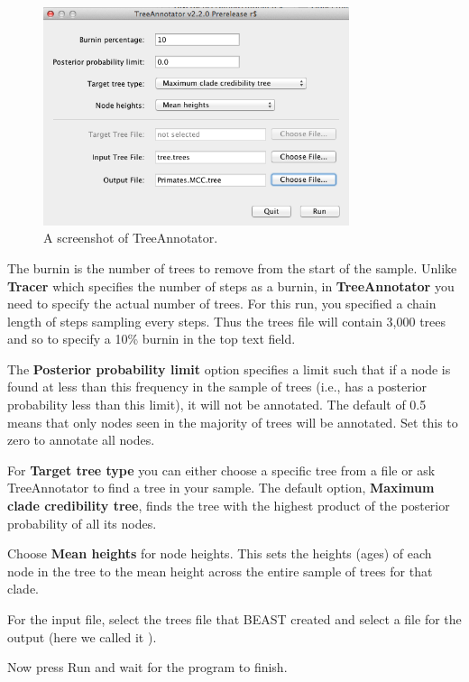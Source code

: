 \documentclass[11pt]{article}
\theoremstyle{plain}%
\theoremstyle{definition}
\theoremstyle{remark}
\begin{document}
\begin{figure}
\includegraphics[width=0.8\textwidth]{figures/TreeAnnotator1}
\caption{A screenshot of TreeAnnotator.}
\label{fig:TreeAnnotator1}
\end{figure}

The burnin is the number of trees to remove from the start of the sample. Unlike {\bf Tracer} which specifies the number of
steps as a burnin, in {\bf TreeAnnotator} you need to specify the actual number of trees. For this run, you specified a chain
length of \chainLength{} steps sampling every \logEvery{} steps. Thus the trees file will contain 3,000 trees and so to specify a 10\% burnin
in the top text field.

The {\bf Posterior probability limit} option specifies a limit such that if a node is found at less than this frequency in the sample
of trees (i.e., has a posterior probability less than this limit), it will not be annotated. The default of 0.5 means that only nodes
seen in the majority of trees will be annotated. Set this to zero to annotate all nodes.

For {\bf Target tree type} you can either choose a specific tree from a file or ask TreeAnnotator to find a tree in your sample.
The default option, {\bf Maximum clade credibility tree}, finds the tree with the highest product of the posterior probability of
all its nodes.

Choose {\bf Mean heights} for node heights. This sets the heights (ages) of each node in the tree to the mean height across the
entire sample of trees for that clade.

For the input file, select the trees file that BEAST created and select a file for the
output (here we called it \mccTree{}).

Now press Run and wait for the program to finish.
\end{document}
